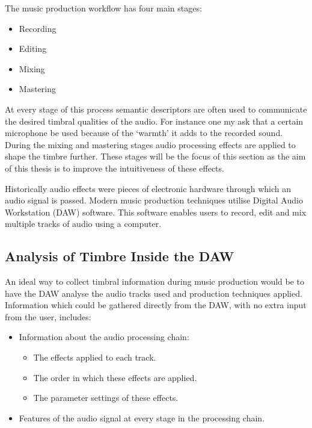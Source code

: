 		The music production workflow has four main stages:

		\begin{itemize}
			\item Recording
			\item Editing
			\item Mixing
			\item Mastering
		\end{itemize}

		At every stage of this process semantic descriptors are often used to communicate the desired timbral
		qualities of the audio. For instance one my ask that a certain microphone be used because of the `warmth' it
		adds to the recorded sound. During the mixing and mastering stages audio processing effects are applied to
		shape the timbre further.  These stages will be the focus of this section as the aim of this thesis is to
		improve the intuitiveness of these effects.

		Historically audio effects were pieces of electronic hardware through which an audio signal is passed.
		Modern music production techniques utilise Digital Audio Workstation (DAW) software. This software enables
		users to record, edit and mix multiple tracks of audio using a computer. 
		
	\subsection{Analysis of Timbre Inside the DAW}
		An ideal way to collect timbral information during music production would be to have the DAW analyse the
		audio tracks used and production techniques applied. Information which could be gathered directly from the
		DAW, with no extra input from the user, includes:

		\begin{itemize}
			\item Information about the audio processing chain:
			\begin{itemize}
				\item The effects applied to each track.
				\item The order in which these effects are applied.
				\item The parameter settings of these effects.
			\end{itemize}

			\item Features of the audio signal at every stage in the processing chain.
		\end{itemize}

